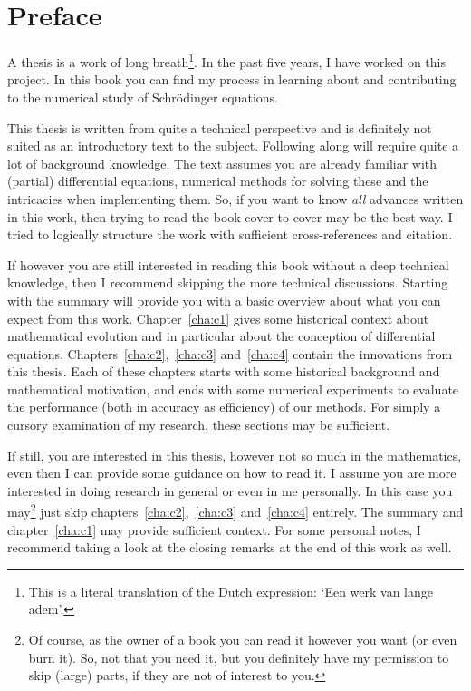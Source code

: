 


\chapter*{Preface}

A thesis is a work of long breath\footnote{This is a literal translation of the Dutch expression: `\foreignlanguage{dutch}{Een werk van lange adem}'.}. In the past five years, I have worked on this project. In this book you can find my process in learning about and contributing to the numerical study of Schrödinger equations.

This thesis is written from quite a technical perspective and is definitely not suited as an introductory text to the subject. Following along will require quite a lot of background knowledge. The text assumes you are already familiar with (partial) differential equations, numerical methods for solving these and the intricacies when implementing them. So, if you want to know \emph{all} advances written in this work, then trying to read the book cover to cover may be the best way. I tried to logically structure the work with sufficient cross-references and citation.

If however you are still interested in reading this book without a deep technical knowledge, then I recommend skipping the more technical discussions. Starting with the summary will provide you with a basic overview about what you can expect from this work. Chapter~\ref{cha:c1} gives some historical context about mathematical evolution and in particular about the conception of differential equations. Chapters~\ref{cha:c2},~\ref{cha:c3} and~\ref{cha:c4} contain the innovations from this thesis. Each of these chapters starts with some historical background and mathematical motivation, and ends with some numerical experiments to evaluate the performance (both in accuracy as efficiency) of our methods. For simply a cursory examination of my research, these sections may be sufficient.

If still, you are interested in this thesis, however not so much in the mathematics, even then I can provide some guidance on how to read it. I assume you are more interested in doing research in general or even in me personally. In this case you may\footnote{Of course, as the owner of a book you can read it however you want (or even burn it). So, not that you need it, but you definitely have my permission to skip (large) parts, if they are not of interest to you.} just skip chapters~\ref{cha:c2},~\ref{cha:c3} and~\ref{cha:c4} entirely. The summary and chapter~\ref{cha:c1} may provide sufficient context. For some personal notes, I recommend taking a look at the closing remarks at the end of this work as well.

